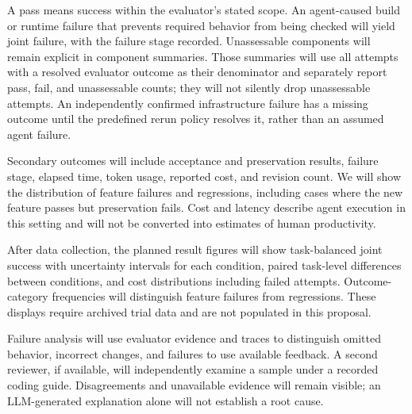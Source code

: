 \documentclass[11pt,a4paper]{article}
\begin{document}

A pass means success within the evaluator's stated scope. An agent-caused build or runtime failure that prevents required behavior from being checked will yield joint failure, with the failure stage recorded. Unassessable components will remain explicit in component summaries. Those summaries will use all attempts with a resolved evaluator outcome as their denominator and separately report pass, fail, and unassessable counts; they will not silently drop unassessable attempts. An independently confirmed infrastructure failure has a missing outcome until the predefined rerun policy resolves it, rather than an assumed agent failure.

Secondary outcomes will include acceptance and preservation results, failure stage, elapsed time, token usage, reported cost, and revision count. We will show the distribution of feature failures and regressions, including cases where the new feature passes but preservation fails. Cost and latency describe agent execution in this setting and will not be converted into estimates of human productivity.

After data collection, the planned result figures will show task-balanced joint success with uncertainty intervals for each condition, paired task-level differences between conditions, and cost distributions including failed attempts. Outcome-category frequencies will distinguish feature failures from regressions. These displays require archived trial data and are not populated in this proposal.

Failure analysis will use evaluator evidence and traces to distinguish omitted behavior, incorrect changes, and failures to use available feedback. A second reviewer, if available, will independently examine a sample under a recorded coding guide. Disagreements and unavailable evidence will remain visible; an LLM-generated explanation alone will not establish a root cause.
\end{document}
